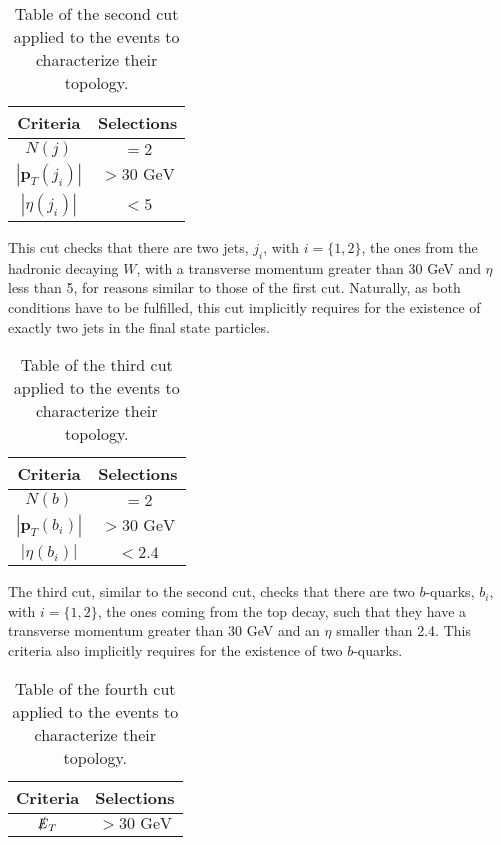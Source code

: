 \begin{table}[ht!]
\centering
\caption{Table of the second cut applied to the events to characterize their topology.}
\label{cut2}
\begin{tabular}{cc}
\hline
\hline
 Criteria & Selections \\
\hline
 $N(j)$ & $= 2$ \\
 $|\bm{p}_T(j_i)|$ & $> 30\textrm{ GeV}$ \\
 $|\eta(j_i)|$ & $< 5$  \\
\hline
\hline
\end{tabular}
\end{table}

This cut checks that there are two jets, $j_i$, with $i=\{1,2\}$, the ones from the hadronic decaying $W$, with a transverse momentum greater than 30 GeV and $\eta$ less than 5, for reasons similar to those of the first cut. Naturally, as both conditions have to be fulfilled, this cut implicitly requires for the existence of exactly two jets in the final state particles.

\begin{table}[ht!]
\centering
\caption{Table of the third cut applied to the events to characterize their topology.}
\label{cut3}
\begin{tabular}{cc}
\hline
\hline
 Criteria & Selections \\
\hline
 $N(b)$ & $= 2$ \\
 $|\bm{p}_T(b_i)|$ & $> 30\textrm{ GeV}$ \\
 $|\eta(b_i)|$ & $< 2.4$  \\
\hline
\hline
\end{tabular}
\end{table}

The third cut, similar to the second cut, checks that there are two $b$-quarks, $b_i$, with $i=\{1,2\}$, the ones coming from the top decay, such that they have a transverse momentum greater than 30 GeV and an $\eta$ smaller than 2.4. This criteria also implicitly requires for the existence of two $b$-quarks.

\begin{table}[ht!]
\centering
\caption{Table of the fourth cut applied to the events to characterize their topology.}
\label{cut4}
\begin{tabular}{cc}
\hline
\hline
 Criteria & Selections \\
\hline
 $\slashed{E}_T$ & $> 30\textrm{ GeV}$  \\
\hline
\hline
\end{tabular}
\end{table}

